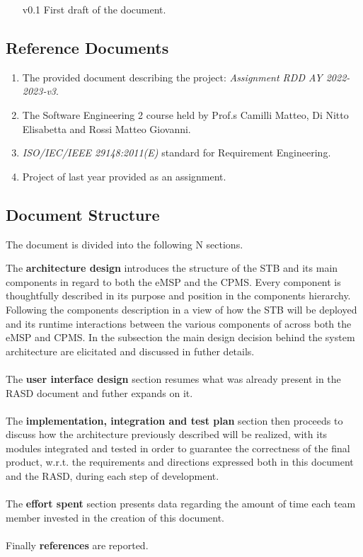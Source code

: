 \documentclass[11pt]{article}
\begin{document}
\begin{enumerate}
    \item[v0.1] First draft of the document.
\end{enumerate}

\subsection{Reference Documents}

\begin{enumerate}
    \item The provided document describing the project: \textit{Assignment RDD AY 2022-2023-v3}.
    \item The Software Engineering 2 course held by Prof.s Camilli Matteo, Di Nitto Elisabetta and Rossi Matteo Giovanni.
    \item \textit{ISO/IEC/IEEE 29148:2011(E)} standard for Requirement Engineering.
    \item Project of last year provided as an assignment.
\end{enumerate}

\subsection{Document Structure}

The document is divided into the following N sections.

The \textbf{architecture design} introduces the structure of the STB and its main components in regard to both the eMSP and the CPMS. Every component is thoughtfully described in its purpose and position in the components hierarchy. Following the components description in a view of how the STB will be deployed and its runtime interactions between the various components of across both the eMSP and CPMS. In the subsection the main design decision behind the system architecture are elicitated and discussed in futher details. \\
\\
The \textbf{user interface design} section resumes what was already present in the RASD document and futher expands on it. \\
\\
The \textbf{implementation, integration and test plan} section then proceeds to discuss how the architecture previously described will be realized, with its modules integrated and tested in order to guarantee the correctness of the final product, w.r.t. the requirements and directions expressed both in this document and the RASD, during each step of development. \\
\\
The \textbf{effort spent} section presents data regarding the amount of time each team member invested in the creation of this document. \\
\\
Finally \textbf{references} are reported.
\end{document}
